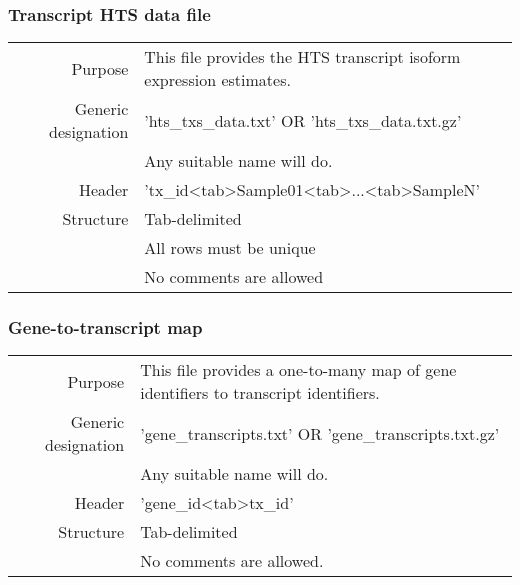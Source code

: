 \documentclass[a4paper,12pt]{article}
\begin{document}
\subsubsection{Transcript HTS data file}
\label{tiep:transcript}

\begin{tabular}{rp{12cm}}
Purpose & This file provides the HTS transcript isoform expression estimates. \\
Generic designation & 'hts\_txs\_data.txt' OR 'hts\_txs\_data.txt.gz' \\
  & Any suitable name will do. \\
Header & 'tx\_id\textless tab\textgreater Sample01\textless tab\textgreater...\textless tab\textgreater SampleN' \\
Structure & Tab-delimited \\
  & All rows must be unique \\
  & No comments are allowed \\
\end{tabular}

\subsubsection{Gene-to-transcript map}
\label{tiep:gene}

\begin{tabular}{rp{12cm}}
Purpose & This file provides a one-to-many map of gene identifiers to transcript  identifiers. \\
Generic designation & 'gene\_transcripts.txt' OR 'gene\_transcripts.txt.gz' \\
  & Any suitable name will do. \\
Header & 'gene\_id\textless tab\textgreater tx\_id' \\
Structure & Tab-delimited \\
  & No comments are allowed. \\
\end{tabular}
\end{document}
